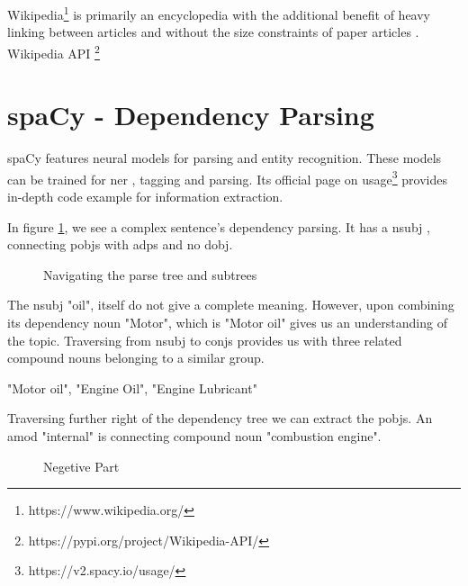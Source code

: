 Wikipedia\footnote{https://www.wikipedia.org/} is primarily an encyclopedia with the additional benefit of heavy linking between articles and without the size constraints of paper articles \cite{TorstenZesch}. Wikipedia API \footnote{https://pypi.org/project/Wikipedia-API/}

\section{spaCy - Dependency Parsing}

spaCy\cite{spacy2} features neural models for parsing and entity recognition. These models can be trained for \acf{ner} , tagging and parsing. Its official page on usage\footnote {https://v2.spacy.io/usage/} provides in-depth code example for information extraction.

In figure \ref{fig:dp}, we see a complex sentence's dependency parsing. It has a \acf{nsubj} , connecting \acfp{pobj} with \acfp{adp} and no \acf{dobj}.

\begin{figure}[htp!]
    \centering    
    
    \caption{Navigating the parse tree and subtrees}
    \label{fig:dp}
\end{figure}

The \acs{nsubj} "oil", itself do not give a complete meaning. However, upon combining its dependency noun "Motor", which is "Motor oil"  gives us an understanding of the topic. Traversing from \acs{nsubj} to  \acfp{conj} provides us with three related compound nouns belonging to a similar group.

"Motor oil", "Engine Oil", "Engine Lubricant"

Traversing further right of the dependency tree we can extract the \acsp{pobj}.  An \acf{amod} "internal" is connecting compound noun "combustion engine".

\begin{figure}[htp!]
    \centering    
    
    \caption{Negetive Part}
    \label{fig:vp}
\end{figure}
